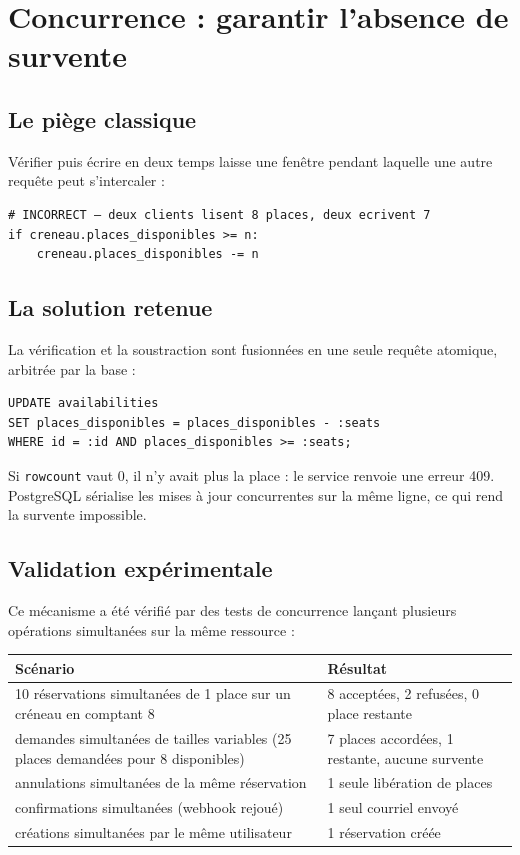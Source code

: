 \documentclass[11pt,a4paper]{report}
\begin{document}
\section{Concurrence : garantir l'absence de survente}

\subsection{Le piège classique}

Vérifier puis écrire en deux temps laisse une fenêtre pendant laquelle une autre
requête peut s'intercaler :

\begin{lstlisting}
# INCORRECT — deux clients lisent 8 places, deux ecrivent 7
if creneau.places_disponibles >= n:
    creneau.places_disponibles -= n
\end{lstlisting}

\subsection{La solution retenue}

La vérification et la soustraction sont fusionnées en une seule requête
atomique, arbitrée par la base :

\begin{lstlisting}
UPDATE availabilities
SET places_disponibles = places_disponibles - :seats
WHERE id = :id AND places_disponibles >= :seats;
\end{lstlisting}

Si \texttt{rowcount} vaut 0, il n'y avait plus la place : le service renvoie une
erreur 409. PostgreSQL sérialise les mises à jour concurrentes sur la même
ligne, ce qui rend la survente impossible.

\subsection{Validation expérimentale}

Ce mécanisme a été vérifié par des tests de concurrence lançant plusieurs
opérations simultanées sur la même ressource :

\begin{longtable}{@{}p{7.4cm}p{7cm}@{}}
\toprule
\textbf{Scénario} & \textbf{Résultat} \\
\midrule
\endhead
10 réservations simultanées de 1 place sur un créneau en comptant 8 &
8 acceptées, 2 refusées, 0 place restante \\
\addlinespace
7 demandes simultanées de tailles variables (25 places demandées pour 8
disponibles) & 7 places accordées, 1 restante, aucune survente \\
\addlinespace
8 annulations simultanées de la même réservation & 1 seule libération de places \\
\addlinespace
8 confirmations simultanées (webhook rejoué) & 1 seul courriel envoyé \\
\addlinespace
8 créations simultanées par le même utilisateur & 1 réservation créée \\
\bottomrule
\end{longtable}
\end{document}
